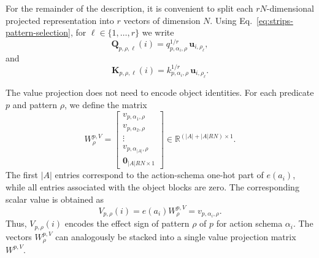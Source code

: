 For the remainder of the description, it is convenient to split each
$rN$-dimensional projected representation into $r$ vectors of dimension $N$.
Using Eq.~\ref{eq:strips-pattern-selection}, for
$\ell\in\{1,\ldots,r\}$ we write
\begin{equation}
\mathbf{Q}_{p,\rho,\ell}(i)
=
q_{p,\alpha_i,\rho}^{1/r}
\,\mathbf{u}_{i,\rho_\ell},
\label{eq:strips-query}
\end{equation}
and
\begin{equation}
\mathbf{K}_{p,\rho,\ell}(i)
=
k_{p,\alpha_i,\rho}^{1/r}
\,\mathbf{u}_{i,\rho_\ell}.
\label{eq:strips-key}
\end{equation}

The value projection does not need to encode object identities.
For each predicate $p$ and pattern $\rho$, we define the matrix
\begin{equation}
W^{p,V}_{\rho}
=
\begin{bmatrix}
v_{p,\alpha_1,\rho}\\[3pt]
v_{p,\alpha_2,\rho}\\[3pt]
\vdots\\[3pt]
v_{p,\alpha_{|A|},\rho}\\[3pt]
\mathbf{0}_{|A|RN\times 1}
\end{bmatrix}
\in
\mathbb{R}^{(|A|+|A|RN)\times 1}.
\label{eq:strips-value-projection}
\end{equation}
The first $|A|$ entries correspond to the action-schema one-hot part of
$e(a_i)$, while all entries associated with the object blocks are zero.
The corresponding scalar value is obtained as
\begin{equation}
V_{p,\rho}(i)
=
e(a_i)W^{p,V}_{\rho}
=
v_{p,\alpha_i,\rho}.
\label{eq:strips-value}
\end{equation}
Thus, $V_{p,\rho}(i)$ encodes the effect sign of pattern $\rho$ of $p$ for action schema $\alpha_i$.
The vectors $W^{p,V}_{\rho}$ can analogously be stacked into a
single value projection matrix $W^{p,V}$.


